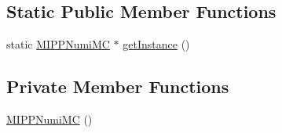 \subsection*{Static Public Member Functions}
\begin{DoxyCompactItemize}
\item 
static \hyperlink{class_neutrino_flux_reweight_1_1_m_i_p_p_numi_m_c}{M\-I\-P\-P\-Numi\-M\-C} $\ast$ \hyperlink{class_neutrino_flux_reweight_1_1_m_i_p_p_numi_m_c_a4324da8640cc9a0d157d82e08da3a1c3}{get\-Instance} ()
\end{DoxyCompactItemize}
\subsection*{Private Member Functions}
\begin{DoxyCompactItemize}
\item 
\hyperlink{class_neutrino_flux_reweight_1_1_m_i_p_p_numi_m_c_ae8c7e36eeda89100905e7de8e338224b}{M\-I\-P\-P\-Numi\-M\-C} ()
\end{DoxyCompactItemize}
